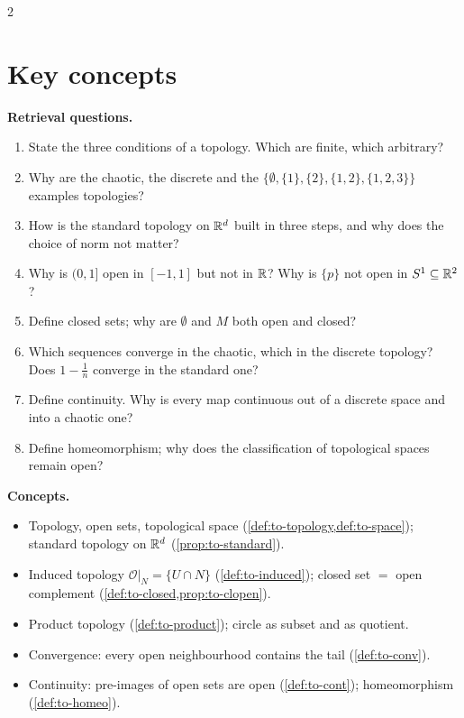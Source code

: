 \begin{paracol}{2}
\section*{Key concepts}
\begin{keyconcepts}
\textbf{Retrieval questions.}
\begin{enumerate}
  \item State the three conditions of a topology. Which are finite, which arbitrary?
  \item Why are the chaotic, the discrete and the $\{\emptyset,\{1\},\{2\},\{1,2\},\{1,2,3\}\}$ examples topologies?
  \item How is the standard topology on $\mathbb{R}^d$ built in three steps, and why does the choice of norm not matter?
  \item Why is $(0,1]$ open in $[-1,1]$ but not in $\mathbb{R}$? Why is $\{p\}$ not open in $S^1\subseteq\mathbb{R}^2$?
  \item Define closed sets; why are $\emptyset$ and $M$ both open and closed?
  \item Which sequences converge in the chaotic, which in the discrete topology? Does $1-\frac1n$ converge in the standard one?
  \item Define continuity. Why is every map continuous out of a discrete space and into a chaotic one?
  \item Define homeomorphism; why does the classification of topological spaces remain open?
\end{enumerate}
\textbf{Concepts.}
\begin{itemize}
  \item Topology, open sets, topological space (\cref{def:to-topology,def:to-space}); standard topology on $\mathbb{R}^d$ (\cref{prop:to-standard}).
  \item Induced topology $\mathcal O|_N=\{U\cap N\}$ (\cref{def:to-induced}); closed set $=$ open complement (\cref{def:to-closed,prop:to-clopen}).
  \item Product topology (\cref{def:to-product}); circle as subset and as quotient.
  \item Convergence: every open neighbourhood contains the tail (\cref{def:to-conv}).
  \item Continuity: pre-images of open sets are open (\cref{def:to-cont}); homeomorphism (\cref{def:to-homeo}).
\end{itemize}
\end{keyconcepts}

\flushside
\end{paracol}

